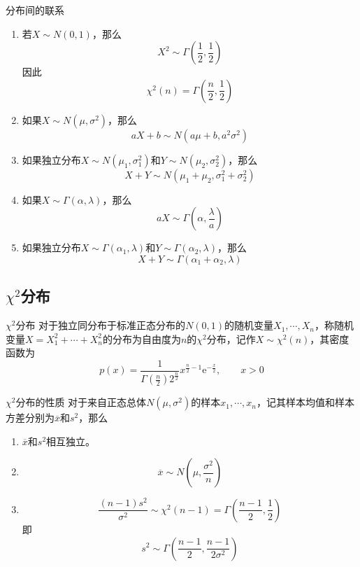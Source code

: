 \documentclass[lang = cn, scheme = chinese, thmcnt = section]{elegantbook}
\begin{document}
\begin{proposition}{分布间的联系}
	\begin{enumerate}
		\item 若$X\sim N(0,1)$，那么
		$$
		X^2\sim \Gamma\left( \frac{1}{2},\frac{1}{2} \right)
		$$
		因此
		$$
		\chi^2(n)=\Gamma\left(\frac{n}{2},\frac{1}{2}\right)
		$$
		\item 如果$X\sim N(\mu,\sigma^2)$，那么
		$$
		aX+b\sim N(a\mu+b,a^2\sigma^2)
		$$
		\item 如果独立分布$X\sim N(\mu_1,\sigma_1^2)$和$Y\sim N(\mu_2,\sigma^2_2)$，那么
		$$
		X+Y\sim N(\mu_1+\mu_2,\sigma_1^2+\sigma_2^2)
		$$
		\item 如果$X\sim\Gamma(\alpha,\lambda)$，那么
		$$
		aX\sim \Gamma(\alpha,\frac{\lambda}{a})
		$$
		\item 如果独立分布$X\sim\Gamma(\alpha_1,\lambda)$和$Y\sim\Gamma(\alpha_2,\lambda)$，那么
		$$
		X+Y\sim \Gamma(\alpha_1+\alpha_2,\lambda)
		$$
	\end{enumerate}
\end{proposition}

\subsection{$\chi^2$分布}

\begin{definition}{$\chi^2$分布}
	对于独立同分布于标准正态分布的$N(0,1)$的随机变量$X_1,\cdots,X_n$，称随机变量$X=X_1^2+\cdots+X_n^2$的分布为自由度为$n$的$\chi^2$分布，记作$X\sim \chi^2(n)$，其密度函数为
	$$
	p(x)=\frac{1}{\Gamma\left(\frac{n}{2}\right)2^{\frac{n}{2}}}x^{\frac{n}{2}-1}\mathrm{e}^{-\frac{x}{2}},\qquad x>0
	$$
\end{definition}

\begin{proposition}{$\chi^2$分布的性质}
	对于来自正态总体$N(\mu,\sigma^2)$的样本$x_1,\cdots,x_n$，记其样本均值和样本方差分别为$\overline{x}$和$s^2$，那么
	\begin{enumerate}
		\item $\overline{x}$和$s^2$相互独立。
		\item 
		$$
		\overline{x}\sim N(\mu,\frac{\sigma^2}{n})
		$$
		\item 
		$$
		\frac{(n-1)s^2}{\sigma^2}\sim \chi^2(n-1)=\Gamma\left(\frac{n-1}{2},\frac{1}{2}\right)
		$$
		即
		$$
		s^2\sim \Gamma\left(\frac{n-1}{2},\frac{n-1}{2\sigma^2}\right)
		$$
	\end{enumerate}
\end{proposition}
\end{document}

